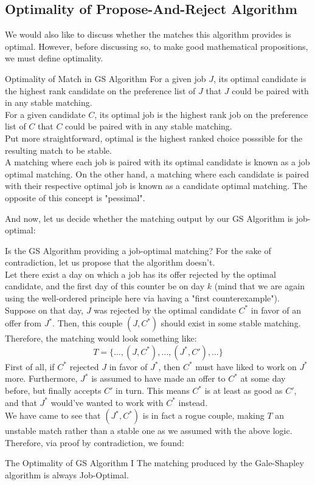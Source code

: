 \subsection{Optimality of Propose-And-Reject Algorithm}
We would also like to discuss whether the matches this algorithm provides is optimal. However, before discussing so, to make good mathematical propositions, we must define optimality.
\begin{ln-define}{Optimality of Match in GS Algorithm}{}
    For a given job $J$, its optimal candidate is the highest rank candidate on the preference list of $J$ that $J$ could be paired with in any stable matching. \\
    For a given candidate $C$, its optimal job is the highest rank job on the preference list of $C$ that $C$ could be paired with in any stable matching. \\
    Put more straightforward, optimal is the highest ranked choice posssible for the resulting match to be stable. \\
    A matching where each job is paired with its optimal candidate is known as a job optimal matching. On the other hand, a matching where each candidate is paired with their respective optimal job is known as a candidate optimal matching.
    The opposite of this concept is "pessimal".
\end{ln-define}
And now, let us decide whether the matching output by our GS Algorithm is job-optimal:
\begin{ln-think}{Is the GS Algorithm providing a job-optimal matching?}{}
    For the sake of contradiction, let us propose that the algorithm doesn't. \\
    Let there exist a day on which a job has its offer rejected by the optimal candidate, and the first day of this counter be on day $k$ (mind that we are again using the well-ordered principle here via having a "first counterexample"). \\
    Suppose on that day, $J$ was rejected by the optimal candidate $C^*$ in favor of an offer from $J^*$. Then, this couple $(J, C^*)$ should exist in some stable matching. Therefore, the matching would look something like:
    \[T = \{\dots, (J, C^*), \dots, (J^*, C'), \dots\}\]
    First of all, if $C^*$ rejected $J$ in favor of $J^*$, then $C^*$ must have liked to work on $J^*$ more. Furthermore, $J^*$ is assumed to have made an offer to $C^*$ at some day before, but finally accepts $C'$ in turn. This means $C^*$ is at least as good as $C'$, and that $J^*$ would've wanted to work with $C^*$ instead. \\
    We have came to see that $(J^*, C^*)$ is in fact a rogue couple, making $T$ an unstable match rather than a stable one as we assumed with the above logic. \\
    Therefore, via proof by contradiction, we found:
    \begin{ln-theorem}{The Optimality of GS Algorithm I}{}
        The matching produced by the Gale-Shapley algorithm is always Job-Optimal.
    \end{ln-theorem}
\end{ln-think}
